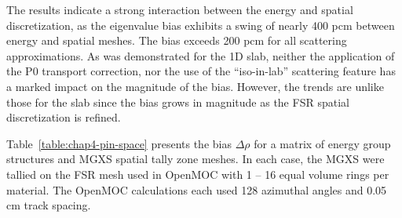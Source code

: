 
The results indicate a strong interaction between the energy and spatial discretization, as the eigenvalue bias exhibits a swing of nearly 400 pcm between energy and spatial meshes. The bias exceeds 200 pcm for all scattering approximations. As was demonstrated for the 1D slab, neither the application of the P0 transport correction, nor the use of the ``iso-in-lab'' scattering feature has a marked impact on the magnitude of the bias. However, the trends are unlike those for the slab since the bias grows in magnitude as the \ac{FSR} spatial discretization is refined.

Table~\ref{table:chap4-pin-space} presents the bias $\Delta\rho$ for a matrix of energy group structures and \ac{MGXS} spatial tally zone meshes. In each case, the \ac{MGXS} were tallied on the \ac{FSR} mesh used in OpenMOC with 1 -- 16 equal volume rings per material. The OpenMOC calculations each used 128 azimuthal angles and 0.05 cm track spacing.


